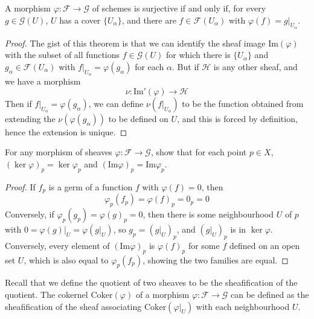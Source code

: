 \begin{theorem}
    A morphism $\varphi: \mathcal{F} \to \mathcal{G}$ of schemes is surjective if and only if, for every $g \in \mathcal{G}(U)$, $U$ has a cover $\{ U_\alpha \}$, and there are $f \in \mathcal{F}(U_\alpha)$ with $\varphi(f) = g|_{U_\alpha}$.
\end{theorem}
\begin{proof}
    The gist of this theorem is that we can identify the sheaf image $\text{Im}(\varphi)$ with the subset of all functions $f \in \mathcal{G}(U)$ for which there is $\{ U_\alpha \}$ and $g_\alpha \in \mathcal{F}(U_\alpha)$ with $f|_{U_\alpha} = \varphi(g_\alpha)$ for each $\alpha$. But if $\mathcal{H}$ is any other sheaf, and we have a morphism
    \[ \nu: \text{Im}'(\varphi) \to \mathcal{H} \]
    Then if $f|_{U_\alpha} = \varphi(g_\alpha)$, we can define $\nu(f|_{U_\alpha})$ to be the function obtained from extending the $\nu(\varphi(g_\alpha))$ to be defined on $U$, and this is forced by definition, hence the extension is unique.
\end{proof}

\begin{theorem}
    For any morphism of sheaves $\varphi: \mathcal{F} \to \mathcal{G}$, show that for each point $p \in X$, $(\ker \varphi)_p = \ker \varphi_p$ and $(\text{Im} \varphi)_p = \text{Im} \varphi_p$.
\end{theorem}
\begin{proof}
    If $f_p$ is a germ of a function $f$ with $\varphi(f) = 0$, then
    \[ \varphi_p(f_p) = \varphi(f)_p = 0_p = 0 \]
    Conversely, if $\varphi_p(g_p) = \varphi(g)_p = 0$, then there is some neighbourhood $U$ of $p$ with $0 = \varphi(g)|_U = \varphi(g|_U)$, so $g_p = (g|_U)_p$, and $(g|_U)_p$ is in $\ker \varphi$. Conversely, every element of $(\text{Im} \varphi)_p$ is $\varphi(f)_p$ for some $f$ defined on an open set $U$, which is also equal to $\varphi_p(f_p)$, showing the two families are equal.
\end{proof}

Recall that we define the quotient of two sheaves to be the sheafification of the quotient. The cokernel $\text{Coker}(\varphi)$ of a morphism $\varphi: \mathcal{F} \to \mathcal{G}$ can be defined as the sheafification of the sheaf associating $\text{Coker}(\varphi|_U)$ with each neighbourhood $U$.

